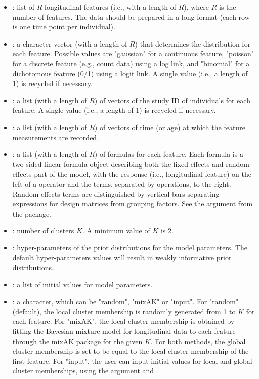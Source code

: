 \begin{itemize}
	\item {}: list of $R$ longitudinal features (i.e., with a length of $R$), where $R$ is the number of features. The data should be prepared in a long format (each row is one time point per individual). 
	\item {}:  a character vector (with a length of $R$) that determines the distribution for each feature. Possible values are "gaussian" for a continuous feature, "poisson" for a discrete feature (e.g., count data) using a log link, and "binomial" for a dichotomous feature (0/1) using a logit link. A single value (i.e., a length of 1) is recycled if necessary. 
	\item {}: a list (with a length of $R$) of vectors of the study ID of individuals for each feature. A single value (i.e., a length of 1) is recycled if necessary. 
	\item {}: a list (with a length of $R$) of vectors of time (or age) at which the feature measurements are recorded. 
	\item {}: a list (with a length of $R$) of formulas for each feature. Each formula is a two-sided linear formula object describing both the fixed-effects and random effects part of the model, with the response (i.e., longitudinal feature) on the left of a \code{~} operator and the terms, separated by \code{+} operations, to the right. Random-effects terms are distinguished by vertical bars \code{(|)} separating expressions for design matrices from grouping factors. See the  argument from the  package.
	\item  {}: number of clusters $K$. A minimum value of $K$ is 2. 
	\item  {}: hyper-parameters of the prior distributions for the model parameters. The default hyper-parameters values will result in weakly informative prior distributions. 
	\item  {}: a list of initial values for model parameters.
	 \item  {}: a character, which can be "random", "mixAK" or "input". For "random" (default), the local cluster membership is randomly generated from 1 to $K$ for each feature.  For "mixAK", the local cluster membership is obtained by fitting the Bayesian mixture model for longitudinal data to each feature through the mixAK package for the given $K$.  For both methods, the global cluster membership is set to be equal to the local cluster membership of the first feature. For "input", the user can input initial values for local and global cluster memberships, using the argument  and . 

\end{itemize}
